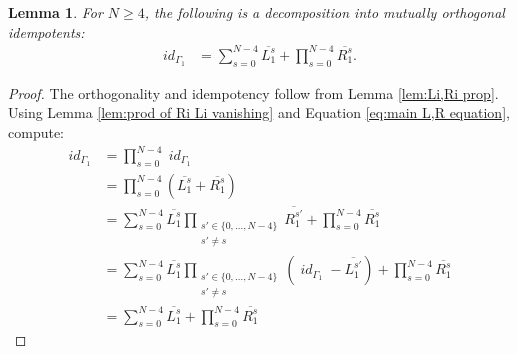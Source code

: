 \documentclass[12pt]{amsart}
\newtheorem{lemma}[theorem]{Lemma}
\theoremstyle{definition}
\theoremstyle{remark}
\numberwithin{equation}{section}
\numberwithin{figure}{section}
\newcommand{\Li}[2]{\overline{L^{#1}_{#2}}}
\newcommand{\Ri}[2]{\overline{R^{#1}_{#2}}}
\DeclareMathOperator{\idfoam}{\mathit{id}}
\begin{document}
\begin{lemma}\label{lem:six vertex categorification}
    For $N \ge 4$, the following is a decomposition into mutually orthogonal idempotents:
    \begin{align}\label{eq:six vertex categorification}
        \idfoam_{\Gamma_1} &= \sum_{s  = 0 }^{N - 4}  \Li{s}{1} + \prod_{s = 0}^{N-4}  \Ri{s}{1}.
    \end{align}
\end{lemma}
\begin{proof}
The orthogonality and idempotency follow from Lemma \ref{lem:Li,Ri prop}. Using Lemma \ref{lem:prod of Ri Li vanishing} and Equation \eqref{eq:main L,R equation}, compute:
    \begin{align*}
        \idfoam_{\Gamma_1}  &= \prod_{s = 0}^{N-4} \idfoam_{\Gamma_1} \\
        &= \prod_{s = 0}^{N-4} \left( \Li{s}{1} + \Ri{s}{1}\right) \\
        &= \sum_{s  = 0 }^{N - 4} \Li{s}{1} \prod_{\substack{s' \in \{0,\ldots,N-4\}\\ s' \neq s}} \Ri{s'}{1} + \prod_{s = 0}^{N-4} \Ri{s}{1} \\
        &= \sum_{s  = 0 }^{N - 4} \Li{s}{1} \prod_{\substack{s' \in \{0,\ldots,N-4\}\\ s' \neq s}} \left( \idfoam_{\Gamma_1} - \Li{s'}{1}\right) + \prod_{s = 0}^{N-4} \Ri{s}{1} \\
        &= \sum_{s  = 0 }^{N - 4} \Li{s}{1} + \prod_{s = 0}^{N-4} \Ri{s}{1}
    \end{align*}
\end{proof}
\end{document}
